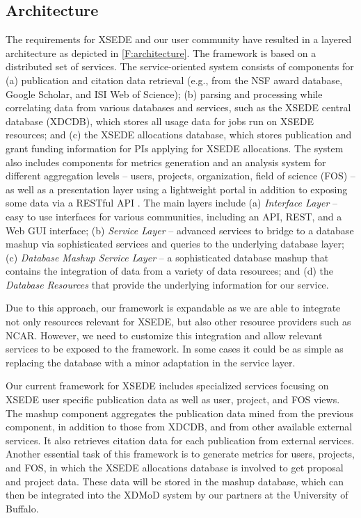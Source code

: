 \documentclass[10pt, conference, compsocconf]{IEEEtran}
\begin{document}
\subsection{Architecture}

The requirements for XSEDE and our user community have resulted in a layered architecture as depicted in \ref{F:architecture}.  The framework is based on a distributed set of services.  The service-oriented system consists of components for (a) publication and citation data retrieval (e.g., from the NSF award database, Google Scholar, and ISI Web of Science); (b) parsing and processing while correlating data from various databases and services, such as the XSEDE central database (XDCDB), which stores all usage data for jobs run on XSEDE resources; and (c) the XSEDE allocations database, which stores publication and grant funding information for PIs applying for XSEDE allocations.  The system also includes components for metrics generation and an analysis system for different aggregation levels -- users, projects, organization, field of science (FOS) -- as well as a presentation layer using a lightweight portal in addition to exposing some data via a RESTful API \cite{las14impact}.  The main layers include (a) {\em Interface Layer} -- easy to use interfaces for various communities, including an API, REST, and a Web GUI interface; (b) {\em Service Layer} -- advanced services to bridge to a database mashup via sophisticated services and queries to the underlying database layer; (c) {\em Database Mashup Service Layer} -- a sophisticated database mashup that contains the integration of data from a variety of data resources; and (d) the {\em Database Resources} that provide the underlying information for our service.

Due to this approach, our framework is expandable as we are able to integrate not only resources relevant for XSEDE, but also other resource providers such as NCAR. However, we need to customize this integration and allow relevant services to be exposed to the framework. In some cases it could be as simple as replacing the database with a minor adaptation in the service layer.



Our current framework for XSEDE includes specialized services focusing on XSEDE user specific publication data as well as user, project, and FOS views. The mashup component aggregates the publication data mined from the previous component, in addition to those from XDCDB, and from other available external services. It also retrieves citation data for each publication from external services. Another essential task of this framework is to generate metrics for users, projects, and FOS, in which the XSEDE allocations database is involved to get proposal and project data. These data will be stored in the mashup database, which can then be integrated into the XDMoD system \cite{Furlani:2013:UXF:2484762.2484763} by our partners at the University of Buffalo.
\end{document}
